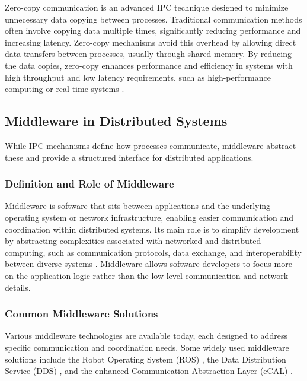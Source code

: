 Zero-copy communication is an advanced IPC technique designed to minimize unnecessary data copying between processes. Traditional communication methods often involve copying data multiple times, significantly reducing performance and increasing latency. Zero-copy mechanisms avoid this overhead by allowing direct data transfers between processes, usually through shared memory. By reducing the data copies, zero-copy enhances performance and efficiency in systems with high throughput and low latency requirements, such as high-performance computing or real-time systems \cite{raiciu2017}.



\subsection{Middleware in Distributed Systems}

While IPC mechanisms define how processes communicate, middleware abstract these and provide a structured interface for distributed applications.

\subsubsection{Definition and Role of Middleware}

Middleware is software that sits between applications and the underlying operating system or network infrastructure, enabling easier communication and coordination within distributed systems. Its main role is to simplify development by abstracting complexities associated with networked and distributed computing, such as communication protocols, data exchange, and interoperability between diverse systems \cite{bernstein1996}. Middleware allows software developers to focus more on the application logic rather than the low-level communication and network details.

\subsubsection{Common Middleware Solutions}

Various middleware technologies are available today, each designed to address specific communication and coordination needs. Some widely used middleware solutions include the Robot Operating System (ROS) \cite{quigley2009}, the Data Distribution Service (DDS) \cite{pardo2003}, and the enhanced Communication Abstraction Layer (eCAL) \cite{ecal_official_docs}.

